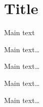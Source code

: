 \documentclass[degree=doctor,language=english]{thuthesis}
\begin{document}
\section{Title}

Main text


\backmatter
\begin{acknowledgements}
  Main text\dots
\end{acknowledgements}

\statement

\begin{resume}
  Main text\dots
\end{resume}

\begin{comments}
  Main text\dots
\end{comments}

\begin{resolution}
  Main text\dots
\end{resolution}

\clearpage
\OMIT
\end{document}
